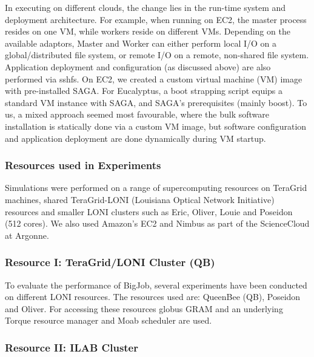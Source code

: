 \documentclass[3p,twocolumn]{elsarticle}
\begin{document}
In executing \sagamapreduce on different clouds, the change lies in
the run-time system and deployment architecture. For example, when
running \sagamapreduce on EC2, the master process resides on one VM,
while workers reside on different VMs.  Depending on the available
adaptors, Master and Worker can either perform local I/O on a
global/distributed file system, or remote I/O on a remote, non-shared
file system.  %
Application deployment and configuration (as discussed above) are also
performed via sshfs.  On EC2, we created a custom virtual machine
(VM) image with pre-installed SAGA.  For Eucalyptus, a boot strapping
script equips a standard VM instance with SAGA, and SAGA's
prerequisites (mainly boost).  To us, a mixed approach seemed most
favourable, where the bulk software installation is statically done
via a custom VM image, but software configuration and application
deployment are done dynamically during VM startup.

\subsubsection{Resources used in Experiments}

Simulations were performed on a range of supercomputing resources on
TeraGrid machines, shared TeraGrid-LONI (Louisiana Optical Network
Initiative)~\cite{loni-url} resources and smaller LONI clusters such
as Eric, Oliver, Louie and Poseidon (512 cores).  We also used
Amazon's EC2 and Nimbus as part of the ScienceCloud at Argonne.

\subsubsection*{Resource I: TeraGrid/LONI Cluster (QB)}

To evaluate the performance of BigJob, several experiments have been
conducted on different LONI resources. The resources used are:
QueenBee (QB), Poseidon and Oliver. For accessing these resources
globus GRAM and an underlying Torque resource manager and Moab
scheduler are used.

\subsubsection*{Resource II: ILAB Cluster}
\end{document}

